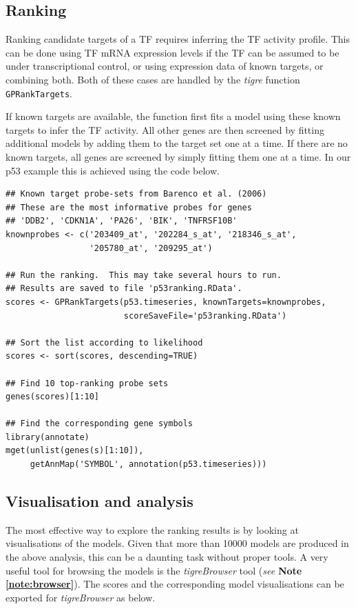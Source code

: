 \documentclass[11pt]{article}
\newcommand{\Rpackage}[1]{\emph{#1}}
\newcommand{\tigre}[0]{\Rpackage{tigre}}
\newcommand{\noteref}[1]{\emph{see} \textbf{Note \ref{#1}}}
\begin{document}
\subsection{Ranking}

Ranking candidate targets of a TF requires inferring the TF activity
profile.  This can be done using TF mRNA expression levels if the TF
can be assumed to be under transcriptional control, or using
expression data of known targets, or combining both.  Both of these
cases are handled by the \tigre{} function \texttt{GPRankTargets}.

If known targets are available, the function first fits a model using
these known targets to infer the TF activity.  All other genes are
then screened by fitting additional models by adding them to the
target set one at a time.  If there are no known targets, all genes
are screened by simply fitting them one at a time.
In our p53 example this is achieved using the code below.

\begin{lstlisting}[frame=single]
## Known target probe-sets from Barenco et al. (2006)
## These are the most informative probes for genes
## 'DDB2', 'CDKN1A', 'PA26', 'BIK', 'TNFRSF10B'
knownprobes <- c('203409_at', '202284_s_at', '218346_s_at',
                 '205780_at', '209295_at')

## Run the ranking.  This may take several hours to run.
## Results are saved to file 'p53ranking.RData'.
scores <- GPRankTargets(p53.timeseries, knownTargets=knownprobes,
                        scoreSaveFile='p53ranking.RData')

## Sort the list according to likelihood
scores <- sort(scores, descending=TRUE)

## Find 10 top-ranking probe sets
genes(scores)[1:10]

## Find the corresponding gene symbols
library(annotate)
mget(unlist(genes(s)[1:10]),
     getAnnMap('SYMBOL', annotation(p53.timeseries)))
\end{lstlisting}

\subsection{Visualisation and analysis}

The most effective way to explore the ranking results is by looking at
visualisations of the models.  Given that more than 10000 models are produced in
the above analysis, this can be a daunting task without proper tools.
A very useful tool for browsing the models is the \emph{tigreBrowser}
tool (\noteref{note:browser}).  The scores and the
corresponding model visualisations can be exported for
\emph{tigreBrowser} as below.
\end{document}
